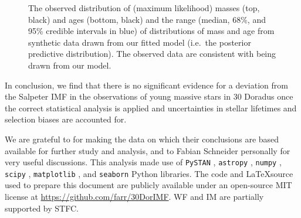 \documentclass[apjl]{emulateapj}
\newcommand{\MSun}{M_\odot}
\begin{document}
\begin{figure}
    		\caption{The observed distribution of (maximum likelihood) masses (top, black) and ages (bottom, black) and the range (median, 68\%, and 95\% credible intervals in blue) of distributions of mass and age from synthetic data drawn from our fitted model (i.e.\ the posterior predictive distribution).  The observed data are consistent with being drawn from our model.  %
		}\label{fig:PPC}
\end{figure}


In conclusion, we find that there is no significant evidence for a deviation from the Salpeter IMF \citep{Salpeter:1955} in the observations of young massive stars in 30 Doradus once the correct statistical analysis is applied and uncertainties in stellar lifetimes and selection biases are accounted for.

\acknowledgments

We are grateful to \citet{Schneider:2018} for making the data on which their conclusions are
based available for further study and analysis, and to Fabian Schneider personally for very useful discussions.  This analysis made use of \texttt{PySTAN} \citep{PySTAN}, \texttt{astropy} \citep{astropy}, \texttt{numpy} \citep{numpy}, \texttt{scipy} \citep{scipy}, \texttt{matplotlib} \citep{matplotlib}, and \texttt{seaborn} \citep{seaborn} Python libraries.  The code and \LaTeX source used to prepare this document are publicly available under an open-source MIT license at \url{https://github.com/farr/30DorIMF}.  WF and IM are partially supported by STFC.  



\end{document}
